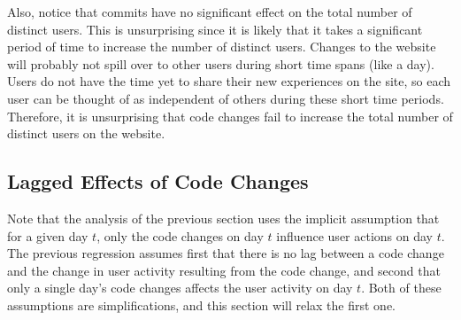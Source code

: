 \documentclass[psamsfonts]{amsart}
\begin{document}
Also, notice that commits have no significant effect on the total number of distinct users. This is unsurprising since it is likely that it takes a significant period of time to increase the number of distinct users. Changes to the website will probably not spill over to other users during short time spans (like a day). Users do not have the time yet to share their new experiences on the site, so each user can be thought of as independent of others during these short time periods. Therefore, it is unsurprising that code changes fail to increase the total number of distinct users on the website. 

\subsection{Lagged Effects of Code Changes}

Note that the analysis of the previous section uses the implicit assumption that for a given day $t$, only the code changes on day $t$ influence user actions on day $t$. The previous regression assumes first that there is no lag between a code change and the change in user activity resulting from the code change, and second that only a single day's code changes affects the user activity on day $t$. Both of these assumptions are simplifications, and this section will relax the first one.
\end{document}
